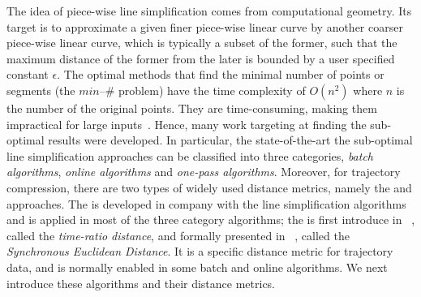 The idea of piece-wise line simplification comes from computational geometry.
Its target is to approximate a given finer piece-wise linear curve by another coarser piece-wise linear curve, which is typically a subset of the former, such that the maximum distance of the former from the later is bounded by a user specified constant $\epsilon$.
The optimal methods that find the minimal number of points or segments (\ie the $min$--$\#$ problem) have the time complexity of $O(n^2)$ where $n$ is the number of the original points\cite{Chan:Optimal}.
They are time-consuming, making them impractical for large inputs~\cite{Heckbert:Survey}. Hence, many work targeting at finding the sub-optimal results were developed.
In particular, the state-of-the-art the sub-optimal line simplification approaches can be classified into three categories, \ie \emph{batch algorithms}, \emph{online algorithms} and \emph{one-pass algorithms}.
%
Moreover, for trajectory compression, there are two types of widely used distance metrics, namely the \ped and \sed approaches.
The \ped is developed in company with the line simplification algorithms and is applied in most of the three category algorithms;
the \sed is first introduce in ~\cite{Meratnia:Spatiotemporal}, called the \emph{time-ratio distance}, and formally presented in ~\cite{Potamias:Sampling}, called the \emph{Synchronous Euclidean Distance}. It is a specific distance metric for trajectory data, and is normally enabled in some batch and online algorithms.
%
We next introduce these algorithms and their distance metrics.

